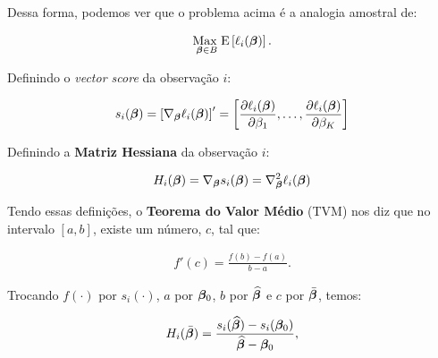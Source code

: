 \documentclass[11pt, oneside, a4paper, article]{article}
\numberwithin{equation}{section}
\begin{document}
\begin{description}
\begin{description}
Dessa forma, podemos ver que o problema acima é a analogia amostral de:

\vspace{-1 em}
\begin{align*}
\underset{\boldsymbol{\beta} \in B}{\text{Max }} 
\text{E} \left[ 
\ell_{i} ( \boldsymbol{\beta} )
\right].
\end{align*}

Definindo o \textit{vector score} da observação $i$:

\vspace{-1 em}
\begin{align*}
s_{i} (\boldsymbol{\beta}) = 
\left[ \nabla_{\boldsymbol{\beta}} \ell_{i} (\boldsymbol{\beta}) \right]'
=
\begin{bmatrix}
	\dfrac{\partial{\ell_{i} (\boldsymbol{\beta})}}{\partial{\beta_{1}}},
	\dots,
	\dfrac{\partial{\ell_{i} (\boldsymbol{\beta})}}{\partial{\beta_{K}}}
\end{bmatrix}
\end{align*}

Definindo a \textbf{Matriz Hessiana} da observação $i$:

\vspace{-1 em}
\begin{align*}
H_{i} (\boldsymbol{\beta}) = 
\nabla_{\boldsymbol{\beta}} s_{i} (\boldsymbol{\beta}) = 
\nabla_{\boldsymbol{\beta}}^2 \ell_{i} (\boldsymbol{\beta})
\end{align*}

Tendo essas definições, o \textbf{Teorema do Valor Médio} (TVM) nos diz que no intervalo $[a, b]$, existe um número, $c$, tal que:

\vspace{-1 em}
\begin{align*}
	f'(c) = \frac{f(b) - f(a)}{b - a}.
\end{align*}

\vspace{1 em}
\begin{center}
\end{center}
\vspace{1 em}

Trocando 
$f(\cdot)$ por $s_{i}(\cdot)$, 
$a$ por $\boldsymbol{\beta}_{0}$, 
$b$ por $\widehat{\boldsymbol{\beta}}$ e
$c$ por $\bar{\boldsymbol{\beta}}$,
temos:

\vspace{-1 em}
\begin{align*}
H_{i} ( \bar{\boldsymbol{\beta}} ) =
\frac{s_{i}( \widehat{\boldsymbol{\beta}} ) - s_{i}( \boldsymbol{\beta}_{0} )}{\widehat{\boldsymbol{\beta}} - \boldsymbol{\beta}_{0}},
\end{align*}


\end{description}
\end{description}
\end{document}
